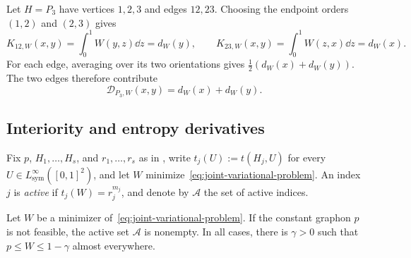 \begin{expl}\label{expl:path-derivative}
Let $H=P_3$ have vertices $1,2,3$ and edges $12,23$.
Choosing the endpoint orders $(1,2)$ and $(2,3)$ gives
\[
  K_{12,W}(x,y)=\int_0^1W(y,z)\dd z=d_W(y),\qquad
  K_{23,W}(x,y)=\int_0^1W(z,x)\dd z=d_W(x).
\]
For each edge, averaging over its two orientations gives
$\tfrac12(d_W(x)+d_W(y))$.  The two edges therefore contribute
\[
  \mathcal D_{P_3,W}(x,y)=d_W(x)+d_W(y).
\]
\end{expl}

\subsection{Interiority and entropy derivatives}\label{sec:upper-tail-interiority}

Fix $p$, $H_1,\dots,H_s$, and $r_1,\dots,r_s$ as in
, write $t_j(U):=t(H_j,U)$ for every
$U\in L^\infty_{\mathrm{sym}}([0,1]^2)$,
and let $W$ minimize~\eqref{eq:joint-variational-problem}.
An index $j$ is \emph{active} if $t_j(W)=r_j^{m_j}$,
and denote by $\mathcal A$ the set of active indices.

\begin{lemma}\label{lem:upper-tail-basic}
Let $W$ be a minimizer of~\eqref{eq:joint-variational-problem}.
If the constant graphon $p$ is not feasible, the active set $\mathcal A$
is nonempty.
In all cases, there is $\gamma>0$ such that $p\le W\le1-\gamma$ almost everywhere.
\end{lemma}

